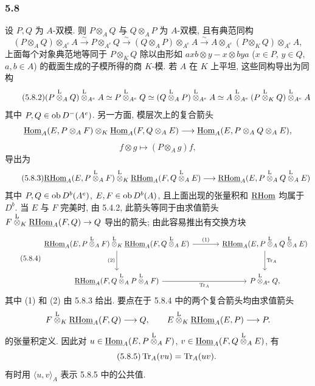 \subsubsection*{5.8}

设 $P,Q$ 为 $A$-双模. 则 $P\otimes_AQ$ 与 $Q\otimes_AP$ 为 $A$-双模, 且有典范同构
\begin{equation}\tag{5.8.1}
(P\otimes_AQ)\otimes_{A^e}A\xrightarrow{\sim}P\otimes_{A^e}Q\xrightarrow{\sim}(Q\otimes_AP)\otimes_{A^e}A\xrightarrow{\sim}A\otimes_{A^e}(P\otimes_KQ)\otimes_{A^e}A,
\end{equation}
上面每个对象典范地等同于 $P\otimes_KQ$ 除以由形如 $axb\otimes y-x\otimes bya$ ($x\in P$, $y\in Q$, $a,b\in A$) 的截面生成的子模所得的商 $K$-模. 若 $A$ 在 $K$ 上平坦, 这些同构导出为同构
\begin{equation}\tag{5.8.2}
(P\overset{\mathrm L}{\otimes}_AQ)\overset{\mathrm L}{\otimes}_{A^e}A\simeq P\overset{\mathrm L}{\otimes}_{A^e}Q\simeq(Q\overset{\mathrm L}{\otimes}_AP)\overset{\mathrm L}{\otimes}_{A^e}A\simeq A\overset{\mathrm L}{\otimes}_{A^e}(P\overset{\mathrm L}{\otimes}_KQ)\overset{\mathrm L}{\otimes}_{A^e}A
\end{equation}
其中 $P,Q\in\operatorname{ob} D^-(A^e)$. 另一方面, 模层次上的复合箭头
\[
\underline{\operatorname{Hom}}_A(E,P\otimes_AF)\otimes_K\underline{\operatorname{Hom}}_A(F,Q\otimes_AE)
\longrightarrow\underline{\operatorname{Hom}}_A(E,P\otimes_AQ\otimes_AE),
\]
\[
f\otimes g\longmapsto (P\otimes_Ag)f,
\]
导出为
\begin{equation}\tag{5.8.3}
\underline{\mathrm{RHom}}_A(E,P\overset{\mathrm L}{\otimes}_AF)\overset{\mathrm L}{\otimes}_K\underline{\mathrm{RHom}}_A(F,Q\overset{\mathrm L}{\otimes}_AE)
\longrightarrow\underline{\mathrm{RHom}}_A(E,P\overset{\mathrm L}{\otimes}_AQ\overset{\mathrm L}{\otimes}_AE)
\end{equation}
其中 $P,Q\in\operatorname{ob} D^b(A^e)$, $E,F\in\operatorname{ob} D^b(A)$, 且上面出现的张量积和 $\underline{\mathrm{RHom}}$ 均属于 $D^b$. 当 $E$ 与 $F$ 完美时, 由 5.4.2, 此箭头等同于由求值箭头 $F\overset{\mathrm L}{\otimes}_K\underline{\mathrm{RHom}}_A(F,Q)\to Q$ 导出的箭头; 由此容易推出有交换方块
\begin{equation}\tag{5.8.4}
\begin{tikzcd}[column sep=large,row sep=large]
\uRHom_A(E,P\lten_AF)\lten_K\uRHom_A(F,Q\lten_AE) \arrow[r,"(1)"] \arrow[d,"(2)"'] & \uRHom_A(E,P\lten_AQ\lten_AE) \arrow[d,"\Tr_A"]\\
\uRHom_A(F,Q\lten_AP\lten_AF) \arrow[r,"\Tr_A"'] & P\lten_{A^e}Q,
\end{tikzcd}
\end{equation}
其中 (1) 和 (2) 由 5.8.3 给出. 要点在于 5.8.4 中的两个复合箭头均由求值箭头
\[
F\overset{\mathrm L}{\otimes}_K\underline{\mathrm{RHom}}_A(F,Q)\longrightarrow Q,\qquad
E\overset{\mathrm L}{\otimes}_K\underline{\mathrm{RHom}}_A(E,P)\longrightarrow P.
\]
的张量积定义. 因此对 $u\in\underline{\operatorname{Hom}}_A(E,P\overset{\mathrm L}{\otimes}_AF)$, $v\in\underline{\operatorname{Hom}}_A(F,Q\overset{\mathrm L}{\otimes}_AE)$, 有
\begin{equation}\tag{5.8.5}
\operatorname{Tr}_A(vu)=\operatorname{Tr}_A(uv).
\end{equation}
有时用 $\langle u,v\rangle_A$ 表示 5.8.5 中的公共值.

